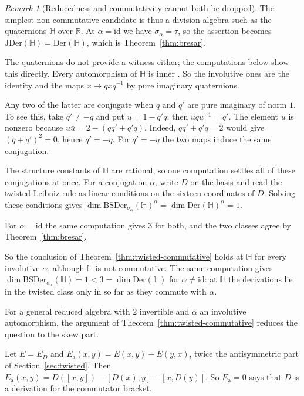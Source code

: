\documentclass[]{interact}
\theoremstyle{plain}
\theoremstyle{definition}
\theoremstyle{remark}
\newtheorem{remark}[theorem]{Remark}
\newcommand{\Der}{\mathrm{Der}}
\newcommand{\JDer}{\mathrm{JDer}}
\newcommand{\BSDer}{\mathrm{BSDer}}
\begin{document}
\begin{remark}[Reducedness and commutativity cannot both be dropped]
The simplest non-commutative candidate is thus a division algebra such as the quaternions $\mathbb{H}$ over $\mathbb{R}$. %
At $\alpha = \mathrm{id}$ we have $\sigma_\alpha = \tau$, so the assertion becomes $\JDer(\mathbb{H}) = \Der(\mathbb{H})$, which is Theorem~\ref{thm:bresar}.

The quaternions do not provide a witness either; the computations below show this directly. %
Every automorphism of $\mathbb{H}$ is inner \citep[\S12.6]{Pierce1982}.
So the involutive ones are the identity and the maps $x \mapsto qxq^{-1}$ by pure imaginary quaternions.

Any two of the latter are conjugate when $q$ and $q'$ are pure imaginary of norm $1$. %
To see this, take $q' \ne -q$ and put $u = 1 - q'q$; then $u q u^{-1} = q'$.
The element $u$ is nonzero because $u\bar{u} = 2 - (qq' + q'q)$.
Indeed, $qq' + q'q = 2$ would give $(q + q')^2 = 0$, hence $q' = -q$.
For $q' = -q$ the two maps induce the same conjugation.

The structure constants of $\mathbb{H}$ are rational, so one computation settles all of these conjugations at once.
For a conjugation $\alpha$, write $D$ on the basis and read the twisted Leibniz rule as linear conditions on the sixteen coordinates of $D$.
Solving these conditions gives $\dim\BSDer_{\sigma_\alpha}(\mathbb{H})^\alpha = \dim\Der(\mathbb{H})^\alpha = 1$.

For $\alpha = \mathrm{id}$ the same computation gives $3$ for both, and the two classes agree by Theorem~\ref{thm:bresar}.

So the conclusion of Theorem~\ref{thm:twisted-commutative} holds at $\mathbb{H}$ for every involutive $\alpha$, although $\mathbb{H}$ is not commutative.
The same computation gives $\dim\BSDer_{\sigma_\alpha}(\mathbb{H}) = 1 < 3 = \dim\Der(\mathbb{H})$ for $\alpha \ne \mathrm{id}$: at $\mathbb{H}$ the derivations lie in the twisted class only in so far as they commute with $\alpha$.

For a general reduced algebra with $2$ invertible and $\alpha$ an involutive automorphism, the argument of Theorem~\ref{thm:twisted-commutative} reduces the question to the skew part.

Let $E = E_D$ and $E_{\mathrm{a}}(x,y) = E(x,y) - E(y,x)$, twice the antisymmetric part of Section~\ref{sec:twisted}.
Then $E_{\mathrm{a}}(x,y) = D([x,y]) - [D(x),y] - [x,D(y)]$.
So $E_{\mathrm{a}} = 0$ says that $D$ is a derivation for the commutator bracket.


\end{remark}
\end{document}
